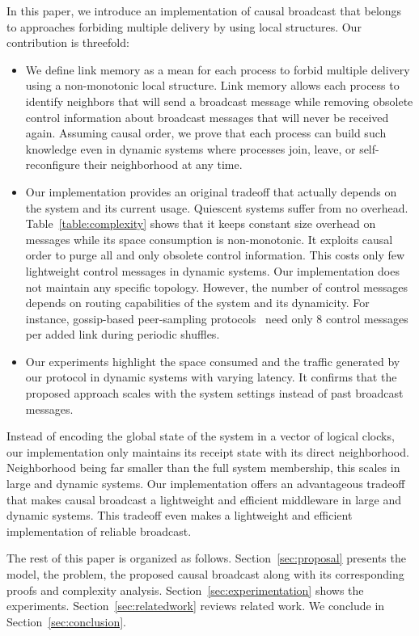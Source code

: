 In this paper, we introduce an implementation of causal broadcast that belongs
to approaches forbiding multiple delivery by using local structures. Our
contribution is threefold:
\begin{itemize}[leftmargin=*]
\item We define link memory as a mean for each process to forbid multiple
  delivery using a non-monotonic local structure. Link memory allows each
  process to identify neighbors that will send a broadcast message while
  removing obsolete control information about broadcast messages that will never
  be received again. Assuming causal order, we prove that each process can build
  such knowledge even in dynamic systems where processes join, leave, or
  self-reconfigure their neighborhood at any time.
\item Our implementation provides an original tradeoff that actually depends on
  the system and its current usage. Quiescent systems suffer from no
  overhead. Table~\ref{table:complexity} shows that it keeps constant size
  overhead on messages while its space consumption is non-monotonic. It exploits
  causal order to purge all and only obsolete control information. This costs
  only few lightweight control messages in dynamic systems.  Our implementation
  does not maintain any specific topology. However, the number of control
  messages depends on routing capabilities of the system and its dynamicity. For
  instance, gossip-based peer-sampling
  protocols~\cite{jelasity2007gossip,jelasity2009tman,nedelec2017adaptive} need
  only 8 control messages per added link during periodic shuffles.
\item Our experiments highlight the space consumed and the traffic generated by
  our protocol in dynamic systems with varying latency. It confirms that the
  proposed approach scales with the system settings instead of past broadcast
  messages.
\end{itemize}
Instead of encoding the global state of the system in a vector of logical
clocks, our implementation only maintains its receipt state with its direct
neighborhood. Neighborhood being far smaller than the full system membership,
this scales in large and dynamic systems.  Our implementation offers an
advantageous tradeoff that makes causal broadcast a lightweight and efficient
middleware in large and dynamic systems. This tradeoff even makes a lightweight
and efficient implementation of reliable broadcast.

The rest of this paper is organized as follows. 
Section~\ref{sec:proposal} presents the model, the problem, the proposed causal
broadcast along with its corresponding proofs and complexity
analysis. Section~\ref{sec:experimentation} shows the
experiments. Section~\ref{sec:relatedwork} reviews related work. We conclude in
Section~\ref{sec:conclusion}.


